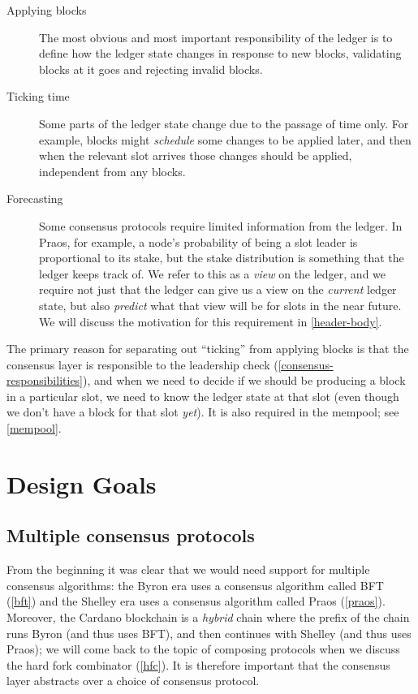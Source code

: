 \begin{description}
\item[Applying blocks] The most obvious and most important responsibility of
the ledger is to define how the ledger state changes in response to new blocks,
validating blocks at it goes and rejecting invalid blocks.

\item[Ticking time] Some parts of the ledger state change due to the passage of
time only. For example, blocks might \emph{schedule} some changes to be applied
later, and then when the relevant slot arrives those changes should be applied,
independent from any blocks.

\item[Forecasting] Some consensus protocols require limited information from the
ledger. In Praos, for example, a node's probability of being a slot leader is
proportional to its stake, but the stake distribution is something that the
ledger keeps track of. We refer to this as a \emph{view} on the ledger, and we
require not just that the ledger can give us a view on the \emph{current} ledger
state, but also \emph{predict} what that view will be for slots in the near
future. We will discuss the motivation for this requirement in
\cref{header-body}.
\end{description}

The primary reason for separating out ``ticking'' from applying blocks is that
the consensus layer is responsible to the leadership check
(\cref{consensus-responsibilities}), and when we need to decide if we should be
producing a block in a particular slot, we need to know the ledger state at that
slot (even though we don't have a block for that slot \emph{yet}). It is also
required in the mempool; see \cref{mempool}.

\section{Design Goals}

\subsection{Multiple consensus protocols}
\label{multiple-consensus-protocols}

From the beginning it was clear that we would need support for multiple
consensus algorithms: the Byron era uses a consensus algorithm called BFT
(\cref{bft}) and the Shelley era uses a consensus algorithm called
Praos (\cref{praos}). Moreover, the Cardano blockchain is a \emph{hybrid}
chain where the prefix of the chain runs Byron (and thus uses BFT), and then
continues with Shelley (and thus uses Praos); we will come back to the topic
of composing protocols when we discuss the hard fork combinator (\cref{hfc}).
It is therefore important that the consensus layer abstracts over a choice
of consensus protocol.

